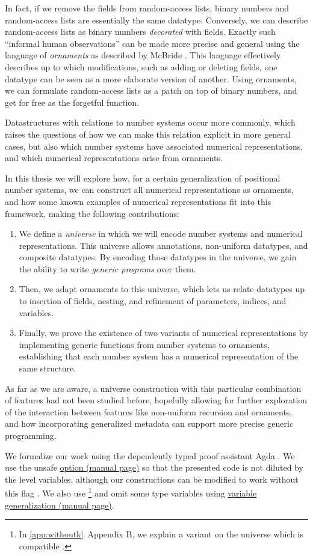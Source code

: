 In fact, if we remove the fields from random-access lists, binary numbers and random-access lists are essentially the same datatype. Conversely, we can describe random-access lists as binary numbers \emph{decorated} with fields. Exactly such ``informal human observations'' can be made more precise and general using the language of \emph{ornaments} as described by McBride \cite{algorn}. This language effectively describes up to which modifications, such as adding or deleting fields, one datatype can be seen as a more elaborate version of another. Using ornaments, we can formulate random-access lists as a patch on top of binary numbers, and get  for free as the forgetful function.

Datastructures with relations to number systems occur more commonly, which raises the questions of how we can make this relation explicit in more general cases, but also which number systems have associated numerical representations, and which numerical representations arise from ornaments.

In this thesis we will explore how, for a certain generalization of positional number systems, we can construct all numerical representations as ornaments, and how some known examples of numerical representations fit into this framework, making the following contributions:
\begin{enumerate}
    \item We define a \emph{universe} in which we will encode number systems and numerical representations. This universe allows annotations, non-uniform datatypes, and composite datatypes. By encoding those datatypes in the universe, we gain the ability to write \emph{generic programs} over them.
    \item Then, we adapt ornaments to this universe, which lets us relate datatypes up to insertion of fields, nesting, and refinement of parameters, indices, and variables.
    \item Finally, we prove the existence of two variants of numerical representations by implementing generic functions from number systems to ornaments, establishing that each number system has a numerical representation of the same structure.
\end{enumerate}
As far as we are aware, a universe construction with this particular combination of features had not been studied before, hopefully allowing for further exploration of the interaction between features like non-uniform recursion and ornaments, and how incorporating generalized metadata can support more precise generic programming. 

We formalize our work using the dependently typed proof assistant Agda \cite{agda}. We use the unsafe \href{https://agda.readthedocs.io/en/latest/language/universe-levels.html}{ option (manual page)} so that the presented code is not diluted by the level variables, although our constructions can be modified to work without this flag \cite{practgen}. We also use \footnote{In \ref{app:withoutk}~Appendix B, we explain a variant on the universe which is compatible .} and omit some type variables using \href{https://agda.readthedocs.io/en/v2.6.4.1/language/generalization-of-declared-variables.html}{variable generalization (manual page)}.